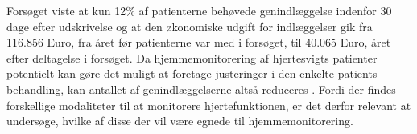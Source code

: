 Forsøget viste at kun 12\% af patienterne behøvede genindlæggelse indenfor 30 dage efter udskrivelse og at den økonomiske udgift for indlæggelser gik fra 116.856 Euro, fra året før patienterne var med i forsøget, til 40.065 Euro, året efter deltagelse i forsøget. \citep{teleprog} Da hjemmemonitorering af hjertesvigts patienter potentielt kan gøre det muligt at foretage justeringer i den enkelte patients behandling, kan antallet af genindlæggelserne altså reduceres \citep{Inan2018}.
Fordi der findes forskellige modaliteter til at monitorere hjertefunktionen, er det derfor relevant at undersøge, hvilke af disse der vil være egnede til hjemmemonitorering.